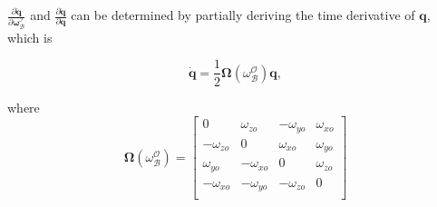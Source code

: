 $\frac{\partial \dot{\mathbf{q}}}{\partial \boldsymbol{\omega}_{\mathcal{B}}^{\mathcal{I}}}$ and $\frac{\partial \dot{\mathbf{q}}}{\partial \mathbf{q}}$ can be determined by partially deriving the time derivative of $\mathbf{q}$, which is

$$\dot{\mathbf{q}} = \frac{1}{2} \boldsymbol{\Omega}(\omega_{\mathcal{B}}^{\mathcal{O}}) \mathbf{q},$$

where $$\boldsymbol{\Omega}(\omega_{\mathcal{B}}^{\mathcal{O}}) = \begin{bmatrix}
	0 & \omega_{zo} & -\omega_{yo} & \omega_{xo} \\
	-\omega_{zo} & 0 & \omega_{xo} & \omega_{yo} \\
	\omega_{yo} & -\omega_{xo} & 0 & \omega_{zo} \\
	-\omega_{xo} & -\omega_{yo} & -\omega_{zo} & 0 \\
\end{bmatrix}$$

